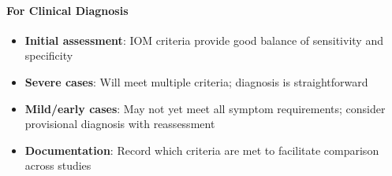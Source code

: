\paragraph{For Clinical Diagnosis}
\begin{itemize}
    \item \textbf{Initial assessment}: IOM criteria provide good balance of sensitivity and specificity
    \item \textbf{Severe cases}: Will meet multiple criteria; diagnosis is straightforward
    \item \textbf{Mild/early cases}: May not yet meet all symptom requirements; consider provisional diagnosis with reassessment
    \item \textbf{Documentation}: Record which criteria are met to facilitate comparison across studies
\end{itemize}


